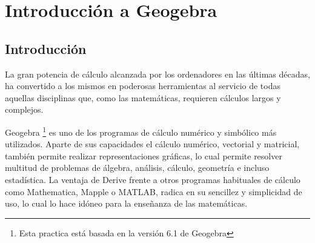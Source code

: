 \chapter{Introducción a Geogebra}

\section{Introducción}
La gran potencia de cálculo alcanzada por los ordenadores en las últimas décadas, ha convertido a los mismos en poderosas herramientas al servicio de todas aquellas disciplinas que, como las matemáticas, requieren cálculos largos y complejos.

Geogebra \renewcommand{\thefootnote}{\fnsymbol{footnote}}\footnote{Esta practica está basada en la versión 6.1 de Geogebra} es uno de los programas de cálculo numérico y simbólico más utilizados.
Aparte de sus capacidades el cálculo numérico, vectorial y matricial, también permite realizar representaciones gráficas, lo cual permite resolver multitud de problemas de álgebra, análisis, cálculo, geometría e incluso estadística.
La ventaja de Derive frente a otros programas habituales de cálculo como Mathematica, Mapple o MATLAB, radica en su sencillez y simplicidad de uso, lo cual lo hace idóneo para la enseñanza de las matemáticas.






